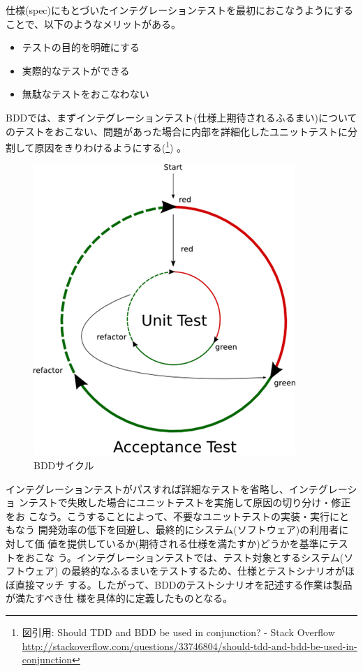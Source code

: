仕様(spec)にもとづいたインテグレーションテストを最初におこなうようにする
ことで、以下のようなメリットがある。
\begin{itemize}
 \item テストの目的を明確にする
 \item 実際的なテストができる
 \item 無駄なテストをおこなわない
\end{itemize}

BDDでは、まずインテグレーションテスト(仕様上期待されるふるまい)について
のテストをおこない、問題があった場合に内部を詳細化したユニットテストに分
割して原因をきりわけるようにする(\footnote{図引用:
Should TDD and BDD be used in conjunction? - Stack Overflow
\url{http://stackoverflow.com/questions/33746804/should-tdd-and-bdd-be-used-in-conjunction}})
。
\begin{figure}[h]
 \centering
 \includegraphics[scale=0.5]{img/bdd-cycle.png}
 \caption{BDDサイクル}
 \label{fig:bdd-cycle}
\end{figure}

インテグレーションテストがパスすれば詳細なテストを省略し、インテグレーショ
ンテストで失敗した場合にユニットテストを実施して原因の切り分け・修正をお
こなう。こうすることによって、不要なユニットテストの実装・実行にともなう
開発効率の低下を回避し、最終的にシステム(ソフトウェア)の利用者に対して価
値を提供しているか(期待される仕様を満たすか)どうかを基準にテストをおこな
う。インテグレーションテストでは、テスト対象とするシステム(ソフトウェア)
の最終的なふるまいをテストするため、仕様とテストシナリオがほぼ直接マッチ
する。したがって、BDDのテストシナリオを記述する作業は製品が満たすべき仕
様を具体的に定義したものとなる。

